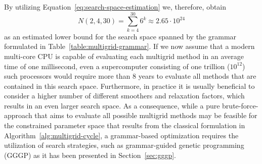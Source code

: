 By utilizing Equation~\eqref{eq:search-space-estimation} we, therefore, obtain 
\begin{equation*}
	N(2, 4, 30) = \sum_{k = 4}^{30} 6^k \approx 2.65 \cdot 10^{24}
\end{equation*}
as an estimated lower bound for the search space spanned by the grammar formulated in Table~\ref{table:multigrid-grammar}.
If we now assume that a modern multi-core CPU is capable of evaluating each multigrid method in an average time of one millisecond,
even a supercomputer consisting of one trillion ($10^{12}$) such processors would require more than 8 years to evaluate all methods that are contained in this search space.
Furthermore, in practice it is usually beneficial to consider a higher number of different smoothers and relaxation factors, which results in an even larger search space.
As a consequence, while a pure brute-force-approach that aims to evaluate all possible multigrid methods may be feasible for the constrained parameter space that results from the classical formulation in Algorithm~\ref{alg:multigrid-cycle}, a grammar-based optimization requires the utilization of search strategies, such as grammar-guided genetic programming (GGGP) as it has been presented in Section~\ref{sec:gggp}.
